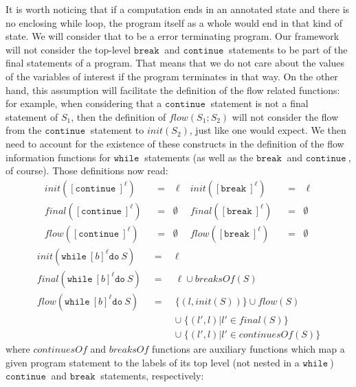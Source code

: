 \documentclass[a4wide,12pt]{article}
\def\eq{\;\; = \;\;}
\def\while{\texttt{while}\ }
\def\do {\texttt{do}\ }
\def\cont {\texttt{continue}\ }
\def\break{\texttt{break}\ }
\begin{document}
It is worth noticing that if a computation ends in an annotated state and there is
no enclosing while loop, the program itself as a whole would end in that kind of state.
We will consider that to be a error terminating program. Our framework will not consider
the top-level $\break$ and $\cont$ statements to be part of the final statements of
a program. That means that we do not care about the values of the variables of interest
if the program terminates in that way. 
On the other hand, this assumption will facilitate the definition of
the flow related functions: for example, when considering that a $\cont$ statement is not
a final statement of $S_1$, then the definition of $flow(S_1;S_2)$ will not consider the flow
from the $\cont$ statement to $init(S_2)$, just like one would expect. We then need to account
for the existence of these constructs in the definition of the flow information functions
for $\while$ statements (as well as the $\break$ and $\cont$, of course).
Those definitions now read:
\begin{align*}
init ([\cont]^\ell) &\eq \ell & init ([\break]^\ell) &\eq \ell \\
final([\cont]^\ell) &\eq \emptyset & final([\break]^\ell) &\eq \emptyset \\
flow ([\cont]^\ell) &\eq \emptyset & flow ([\break]^\ell) &\eq \emptyset
\end{align*}
\begin{eqnarray*}
init (\while [b]^\ell \do S) &\eq& \ell \\
final(\while [b]^\ell \do S) &\eq& \ell \cup breaksOf(S) \\
flow (\while [b]^\ell \do S) &\eq& \{(l,init(S))\} \cup flow(S) \\
                            & & \cup\; \{(l',l) | l' \in final(S)\} \\
                            & & \cup\; \{(l',l) | l' \in continuesOf(S)\}
\end{eqnarray*}
where $continuesOf$ and $breaksOf$ functions are auxiliary functions which map a given program statement
to the labels of its top level (not nested in a $\while$) $\cont$ and $\break$ statements, respectively:
 
\end{document}
